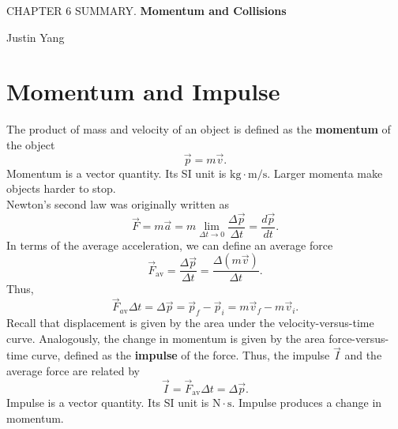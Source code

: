 \documentclass[11pt,a4paper]{report}
\begin{document}
\pagestyle{empty}
\setcounter{secnumdepth}{0}

\begin{center}
\Large{CHAPTER 6 SUMMARY. \textbf{Momentum and Collisions}}

\large{Justin Yang}

\end{center}

\section{Momentum and Impulse}
The product of mass and velocity of an object is defined as the \textbf{momentum} of the object $$\vec{p} = m \vec{v}.$$
Momentum is a vector quantity. Its SI unit is $\mathrm{kg} \cdot \mathrm{m}/\mathrm{s}$. Larger momenta make objects harder to stop.
\\Newton's second law was originally written as $$\vec{F} = m \vec{a} = m \lim_{\Delta{t} \to 0}{\frac{\Delta{\vec{p}}}{\Delta{t}}} = \frac{d\vec{p}}{dt}.$$ In terms of the average acceleration, we can define an average force $$\vec{F}_\mathrm{av} = \frac{\Delta{\vec{p}}}{\Delta{t}} = \frac{\Delta{\left(m \vec{v}\right)}}{\Delta{t}}.$$
Thus, $$\vec{F}_{a\mathrm{v}} \Delta{t} = \Delta{\vec{p}} = \vec{p}_f - \vec{p}_i = m \vec{v}_f - m \vec{v}_i.$$
Recall that displacement is given by the area under the velocity-versus-time curve. Analogously, the change in momentum is given by the area force-versus-time curve, defined as the \textbf{impulse} of the force. Thus, the impulse $\vec{I}$ and the average force are related by $$\vec{I} = \vec{F}_\mathrm{av} \Delta{t} = \Delta{\vec{p}}.$$
Impulse is a vector quantity. Its SI unit is $\mathrm{N} \cdot \mathrm{s}$. Impulse produces a change in momentum.
\end{document}
